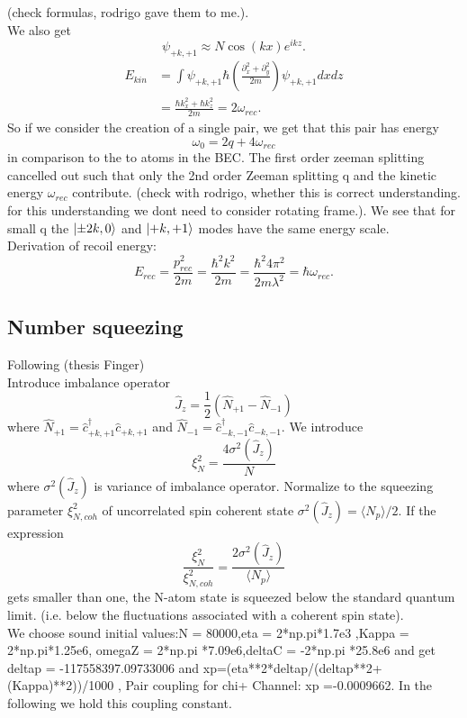  (check formulas, rodrigo gave them to me.).
 \\
 We also get
 \begin{equation}
 	\psi_{+k,+1} \approx N \cos(kx)e^{ikz}.
 \end{equation}
\begin{align}
	E_{kin} &= \int \psi_{+k,+1} \hbar \left ( \frac{\partial_x^2 + \partial_y^2}{2m} \right) \psi_{+k,+1} dx dz
	\\
	& =\frac{\hbar k_x^2 + \hbar k_z^2}{2m} = 2 \omega_{rec}.
\end{align}
So if we consider the creation of a single pair, we get that this pair has energy 
\begin{equation}
	\omega_0 = 2q + 4 \omega_{rec}
\end{equation} 
in comparison to the to atoms in the BEC. The first order zeeman splitting cancelled out such that only the 2nd order Zeeman splitting q and the kinetic energy $\omega_{rec}$ contribute. (check with rodrigo, whether this is correct understanding. for this understanding we dont need to consider rotating frame.). We see that for small q the $\ket{\pm 2k,0}$ and $\ket{+k,+1}$ modes have the same energy scale. 
\\
Derivation of recoil energy:
\begin{equation}
	E_{rec} = \frac{p_{rec}^2}{2m} = \frac{\hbar^2 k^2}{2m} = \frac{\hbar^2 4 \pi^2}{2 m \lambda^2} = \hbar \omega_{rec}.
\end{equation}
\subsection{Number squeezing}
Following (thesis Finger)
\\
Introduce imbalance operator
\begin{equation}
	\hat{J}_z = \frac{1}{2} (\hat{N}_{+1}- \hat{N}_{-1})
\end{equation}
where $\hat{N}_{+1} = \hat{c}_{+k,+1}^\dag \hat{c}_{+k,+1}$ and $\hat{N}_{-1} = \hat{c}_{-k,-1}^\dag \hat{c}_{-k,-1}$. 
We introduce 
\begin{equation}
	\xi_N^2 = \frac{4 \sigma^2(\hat{J}_z)}{N}
\end{equation}
where $\sigma^2(\hat{J}_z)$ is variance of imbalance operator. Normalize to the squeezing parameter $\xi_{N,coh}^2$ of uncorrelated spin coherent state $\sigma^2(\hat{J}_z) = \langle N_p \rangle / 2$. If the expression
\begin{equation}
	\frac{\xi_N^2}{\xi^2_{N,coh}} = \frac{2 \sigma^2(\hat{J}_z)}{\langle N_p \rangle}
\end{equation} 
gets smaller than one, the N-atom state is squeezed below the standard quantum limit. (i.e. below the fluctuations associated with a coherent spin state). 
\\
We choose sound initial values:N = 80000,eta = 2*np.pi*1.7e3 ,Kappa = 2*np.pi*1.25e6, omegaZ = 2*np.pi *7.09e6,deltaC = -2*np.pi *25.8e6 and get deltap = -117558397.09733006 and xp=(eta**2*deltap/(deltap**2+(Kappa)**2))/1000 , Pair coupling for chi+ Channel: xp =-0.0009662. In the following we hold this coupling constant.


